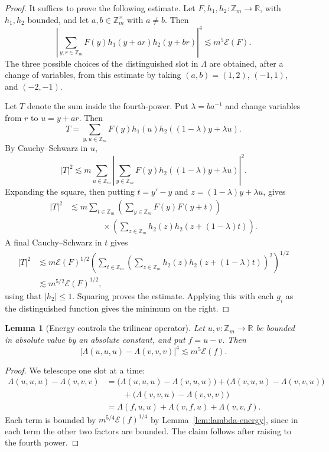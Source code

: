 \documentclass[11pt]{amsart}
\newcommand{\Z}{\mathbb{Z}}
\newcommand{\abs}[1]{\lvert#1\rvert}
\numberwithin{equation}{section}
\theoremstyle{plain}
\newtheorem{lemma}[theorem]{Lemma}
\theoremstyle{remark}
\begin{document}
\begin{proof}
It suffices to prove the following estimate. Let $F,h_1,h_2\colon\Z_m\to\mathbb R$,
with $h_1,h_2$ bounded, and let $a,b\in\Z_m^\times$ with $a\neq b$. Then
\[
        \left|\sum_{y,r\in\Z_m}F(y)h_1(y+ar)h_2(y+br)\right|^4
        \lesssim m^5\mathcal E(F).
\]
The three possible choices of the distinguished slot in $\Lambda$ are obtained,
after a change of variables, from this estimate by taking $(a,b)=(1,2)$,
$(-1,1)$, and $(-2,-1)$.

Let $T$ denote the sum inside the fourth-power. Put $\lambda=ba^{-1}$ and
change variables from $r$ to $u=y+ar$. Then
\[
T=\sum_{y,u\in\Z_m}F(y)h_1(u)h_2((1-\lambda)y+\lambda u).
\]
By Cauchy--Schwarz in $u$,
\[
\abs{T}^2\lesssim m\sum_{u\in\Z_m}
\left|\sum_{y\in\Z_m}F(y)h_2((1-\lambda)y+\lambda u)\right|^2.
\]
Expanding the square, then putting $t=y'-y$ and $z=(1-\lambda)y+\lambda u$, gives
\[
\begin{aligned}
\abs{T}^2
&\lesssim m\sum_{t\in\Z_m}
\left(\sum_{y\in\Z_m}F(y)F(y+t)\right) \\
&\qquad\qquad\times
\left(\sum_{z\in\Z_m}h_2(z)h_2(z+(1-\lambda)t)\right).
\end{aligned}
\]
A final Cauchy--Schwarz in $t$ gives
\[
\begin{aligned}
\abs{T}^2
&\lesssim m\mathcal E(F)^{1/2}
\left(\sum_{t\in\Z_m}
\left(\sum_{z\in\Z_m}h_2(z)h_2(z+(1-\lambda)t)\right)^2
\right)^{1/2} \\
&\lesssim m^{5/2}\mathcal E(F)^{1/2},
\end{aligned}
\]
using that $|h_2|\leq 1$. Squaring proves the estimate. Applying this with each
$g_i$ as the distinguished function gives the minimum on the right.
\end{proof}

\begin{lemma}[Energy controls the trilinear operator]\label{lem:trilinear-discrepancy}
Let $u,v\colon\Z_m\to\mathbb R$ be bounded in absolute value by an absolute
constant, and put $f=u-v$. Then
\[
        \abs{\Lambda(u,u,u)-\Lambda(v,v,v)}^4\lesssim m^5\mathcal E(f).
\]
\end{lemma}

\begin{proof}
We telescope one slot at a time:
\[
\begin{aligned}
\Lambda(u,u,u)-\Lambda(v,v,v)
&=\bigl(\Lambda(u,u,u)-\Lambda(v,u,u)\bigr)
 +\bigl(\Lambda(v,u,u)-\Lambda(v,v,u)\bigr)  \\
&\qquad
 +\bigl(\Lambda(v,v,u)-\Lambda(v,v,v)\bigr)  \\
&=\Lambda(f,u,u)+\Lambda(v,f,u)+\Lambda(v,v,f).
\end{aligned}
\]
Each term is bounded by $m^{5/4}\mathcal E(f)^{1/4}$ by
Lemma~\ref{lem:lambda-energy}, since in each term the other two factors are
bounded. The claim follows after raising to the fourth power.
\end{proof}
\end{document}

